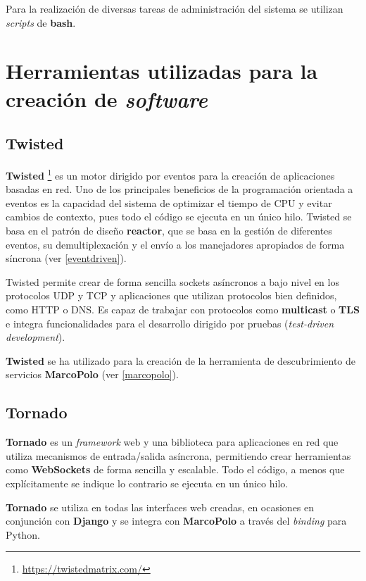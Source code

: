 Para la realización de diversas tareas de administración del sistema se utilizan \textit{scripts} de \textbf{bash}. 

\section{Herramientas utilizadas para la creación de \textit{software}}

\subsection{Twisted}

\textbf{Twisted} \footnote{\href{https://twistedmatrix.com/}{https://twistedmatrix.com/}} es un motor dirigido por eventos para la creación de aplicaciones basadas en red. Uno de los principales beneficios de la programación orientada a eventos es la capacidad del sistema de optimizar el tiempo de CPU y evitar cambios de contexto, pues todo el código se ejecuta en un único hilo. Twisted se basa en el patrón de diseño \textbf{reactor}\cite{Coplien95reactor}, que se basa en la gestión de diferentes eventos, su demultiplexación y el envío a los manejadores apropiados de forma síncrona (ver \ref{eventdriven}).

Twisted permite crear de forma sencilla sockets asíncronos a bajo nivel en los protocolos UDP y TCP y aplicaciones que utilizan protocolos bien definidos, como HTTP o DNS. Es capaz de trabajar con protocolos como \textbf{multicast} o \textbf{TLS} e integra funcionalidades para el desarrollo dirigido por pruebas (\textit{test-driven development}).

\textbf{Twisted} se ha utilizado para la creación de la herramienta de descubrimiento de servicios \textbf{MarcoPolo} (ver \ref{marcopolo}).

\subsection{Tornado}

\textbf{Tornado} es un \textit{framework} web y una biblioteca para aplicaciones en red que utiliza mecanismos de entrada/salida asíncrona, permitiendo crear herramientas como \textbf{WebSockets} de forma sencilla y escalable. Todo el código, a menos que explícitamente se indique lo contrario se ejecuta en un único hilo.

\textbf{Tornado} se utiliza en todas las interfaces web creadas, en ocasiones en conjunción con \textbf{Django} y se integra con \textbf{MarcoPolo} a través del \textit{binding} para Python.

